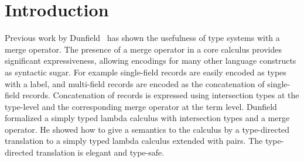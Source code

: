 \section{Introduction}
\label{sec:intro}

Previous work by Dunfield~\cite{dunfield2014elaborating} has shown the
usefulness of type systems with a merge operator. The presence of a merge
operator in a core calculus provides significant expressiveness, allowing
encodings for many other language constructs as syntactic sugar. For example
single-field records are easily encoded as types with a label, and multi-field
records are encoded as the concatenation of single-field records. Concatenation
of records is expressed using intersection types at the type-level and the
corresponding merge operator at the term level. Dunfield formalized a simply
typed lambda calculus with intersection types and a merge operator. He showed
how to give a semantics to the calculus by a type-directed translation to a
simply typed lambda calculus extended with pairs. The type-directed translation
is elegant and type-safe.


